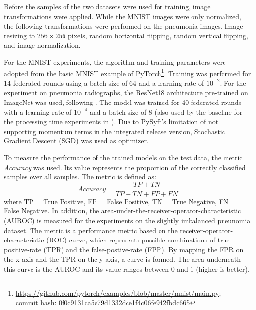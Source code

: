 Before the samples of the two datasets were used for training, image transformations were applied. While the MNIST images were only normalized, the following transformations were performed on the pneumonia images.
Image resizing to $256 \times 256$ pixels,
random horizontal flipping,
random vertical flipping,
and image normalization.

For the MNIST experiments, the algorithm and training parameters were adopted from the basic MNIST example of PyTorch\footnote{\url{https://github.com/pytorch/examples/blob/master/mnist/main.py};\\commit hash: 0f0c9131ca5c79d1332dce1f4c06fe942fbdc665}. Training was performed for 14 federated rounds using a batch size of 64 and a learning rate of $10^{-2}$. For the experiment on pneumonia radiographs, the ResNet18 \citep{He2016DeepRecognition} architecture pre-trained on ImageNet was used, following \cite{Kaissis2021End-to-endImaging}. The model was trained for 40 federated rounds with a learning rate of $10^{-4}$ and a batch size of 8 (also used by the baseline for the processing time experiments in \cite{Kaissis2021End-to-endImaging}). Due to PySyft's limitation of not supporting momentum terms in the integrated release version, Stochastic Gradient Descent (SGD) was used as optimizer.

To measure the performance of the trained models on the test data, the metric \textit{Accuracy} was used. Its value represents the proportion of the correctly classified samples over all samples. The metric is defined as:
\begin{equation}
Accuracy=\frac{TP + TN}{TP + TN + FP + FN} \label{eq:accuracy}
\end{equation}
where TP = True Positive, FP = False Positive, TN = True Negative, FN = False Negative.
In addition, the area-under-the-receiver-operator-characteristic (AUROC) is measured for the experiments on the slightly imbalanced pneunomia dataset.
The metric is a performance metric based on the receiver-operator-characteristic (ROC) curve, which represents possible combinations of true-positive-rate (TPR) and the false-postive-rate (FPR).
By mapping the FPR on the x-axis and the TPR on the y-axis, a curve is formed. The area underneath this curve is the AUROC and its value ranges between 0 and 1 (higher is better). 


